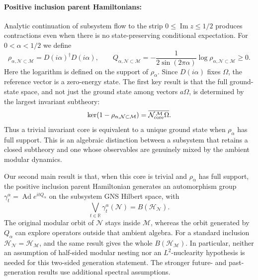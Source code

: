 \documentclass[a4paper,11pt]{article}
\theoremstyle{definition}
\newcommand{\mN}{\mathcal{N}}
\newcommand{\mH}{\mathcal{H}}
\newcommand{\mM}{\mathcal{M}}
\begin{document}
\paragraph{Positive inclusion parent Hamiltonians:}
Analytic continuation of subsystem flow to the strip $0\leq\operatorname{Im}z\leq1/2$ produces contractions even when there is no state-preserving conditional expectation. For $0<\alpha<1/2$ we define
\begin{equation}
 \rho_{\alpha,\mN\subset\mM}=D(i\alpha)^\dagger D(i\alpha),\qquad
 Q_{\alpha,\mN\subset\mM}
 =-\frac{1}{2\sin(2\pi\alpha)}\log\rho_{\alpha,\mN\subset\mM}\geq0 .
 \label{eq:intro-Halpha}
\end{equation}
Here the logarithm is defined on the support of $\rho_\alpha$. Since $D(i\alpha)$ fixes $\Omega$, the reference vector is a zero-energy state. The first key result is that the full ground-state space, and not just the ground state among vectors $a\Omega$, is determined by the largest invariant subtheory:
\begin{equation}
 \ker(1-\rho_{\alpha,\mN\subset\mM})
 =\overline{\mN_{\rm core}^{\,\mM}\Omega}.
 \label{eq:intro-ground-core}
\end{equation}
Thus a trivial invariant core is equivalent to a unique ground state when $\rho_\alpha$ has full support. This is an algebraic distinction between a subsystem that retains a closed subtheory and one whose observables are genuinely mixed by the ambient modular dynamics.

Our second main result is that, when this core is trivial and $\rho_\alpha$ has full support, the positive inclusion parent Hamiltonian generates an automorphism group $\gamma_t^\alpha=\operatorname{Ad}e^{itQ_\alpha}$ on the subsystem GNS Hilbert space, with
\begin{equation}
 \boxed{\qquad
 \bigvee_{t\in\mathbb R}\gamma_t^\alpha(\mN)=B(\mH_{\mN}) .\qquad}
 \label{eq:intro-full-generation}
\end{equation}
The original modular orbit of $\mN$ stays inside $\mM$, whereas the orbit generated by $Q_\alpha$ can explore operators outside that ambient algebra. For a standard inclusion $\mH_{\mN}=\mH_{\mM}$, and the same result gives the whole $B(\mH_{\mM})$. In particular, neither an assumption of half-sided modular nesting nor an $L^2$-nuclearity hypothesis is needed for this two-sided generation statement. The stronger future- and past-generation results use additional spectral assumptions.
\end{document}
